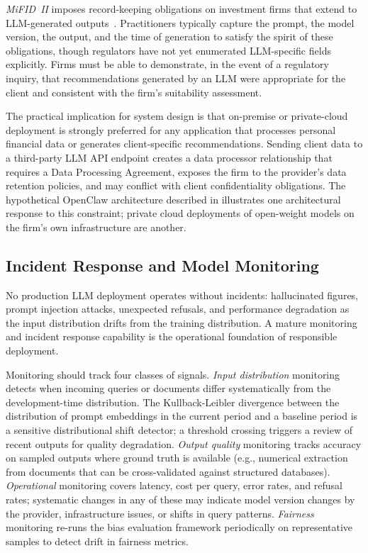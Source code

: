 \begin{context}
\emph{MiFID~II} imposes record-keeping obligations on investment firms that extend to LLM-generated outputs~\citep{esma2018mifid2}. Practitioners typically capture the prompt, the model version, the output, and the time of generation to satisfy the spirit of these obligations, though regulators have not yet enumerated LLM-specific fields explicitly. Firms must be able to demonstrate, in the event of a regulatory inquiry, that recommendations generated by an LLM were appropriate for the client and consistent with the firm's suitability assessment.

The practical implication for system design is that on-premise or private-cloud deployment is strongly preferred for any application that processes personal financial data or generates client-specific recommendations. Sending client data to a third-party LLM API endpoint creates a data processor relationship that requires a Data Processing Agreement, exposes the firm to the provider's data retention policies, and may conflict with client confidentiality obligations. The hypothetical OpenClaw architecture described in  illustrates one architectural response to this constraint; private cloud deployments of open-weight models on the firm's own infrastructure are another.

\subsection{Incident Response and Model Monitoring}
\label{subsec:af-deployment-monitoring}

No production LLM deployment operates without incidents: hallucinated figures, prompt injection attacks, unexpected refusals, and performance degradation as the input distribution drifts from the training distribution. A mature monitoring and incident response capability is the operational foundation of responsible deployment.

Monitoring should track four classes of signals. \emph{Input distribution} monitoring detects when incoming queries or documents differ systematically from the development-time distribution. The Kullback-Leibler divergence between the distribution of prompt embeddings in the current period and a baseline period is a sensitive distributional shift detector; a threshold crossing triggers a review of recent outputs for quality degradation. \emph{Output quality} monitoring tracks accuracy on sampled outputs where ground truth is available (e.g., numerical extraction from documents that can be cross-validated against structured databases). \emph{Operational} monitoring covers latency, cost per query, error rates, and refusal rates; systematic changes in any of these may indicate model version changes by the provider, infrastructure issues, or shifts in query patterns. \emph{Fairness} monitoring re-runs the bias evaluation framework periodically on representative samples to detect drift in fairness metrics.


\end{context}
